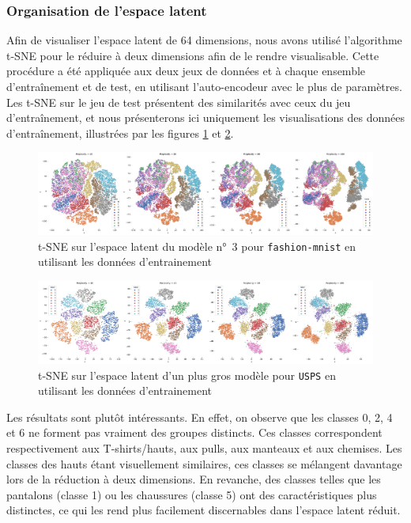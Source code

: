\documentclass{article}
\begin{document}
\subsubsection{Organisation de l'espace latent}

Afin de visualiser l'espace latent de 64 dimensions, nous avons utilisé l'algorithme t-SNE pour le réduire à deux dimensions afin de le rendre visualisable. Cette procédure a été appliquée aux deux jeux de données et à chaque ensemble d'entraînement et de test, en utilisant l'auto-encodeur avec le plus de paramètres. Les t-SNE sur le jeu de test présentent des similarités avec ceux du jeu d'entraînement, et nous présenterons ici uniquement les visualisations des données d'entraînement, illustrées par les figures \ref{fig:tsneMnist} et \ref{fig:tsneUsps}.

\begin{figure}[htbp]
    \centering
    \includegraphics*[width=.75\textwidth]{tsne_mnist_train_big.pdf}
    \caption{t-SNE sur l'espace latent du modèle n°~3 pour \texttt{fashion-mnist} en utilisant les données d'entrainement}
    \label{fig:tsneMnist}
\end{figure}

\begin{figure}[htbp]
    \centering
    \includegraphics*[width=.75\textwidth]{tsne_usps_train_big.pdf}
    \caption{t-SNE sur l'espace latent d'un plus gros modèle pour \texttt{USPS} en utilisant les données d'entrainement}
    \label{fig:tsneUsps}
\end{figure}

Les résultats sont plutôt intéressants. En effet, on observe que les classes 0, 2, 4 et 6 ne forment pas vraiment des groupes distincts. Ces classes correspondent respectivement aux T-shirts/hauts, aux pulls, aux manteaux et aux chemises. Les classes des hauts étant visuellement similaires, ces classes se mélangent davantage lors de la réduction à deux dimensions. En revanche, des classes telles que les pantalons (classe 1) ou les chaussures (classe 5) ont des caractéristiques plus distinctes, ce qui les rend plus facilement discernables dans l'espace latent réduit.
\end{document}
